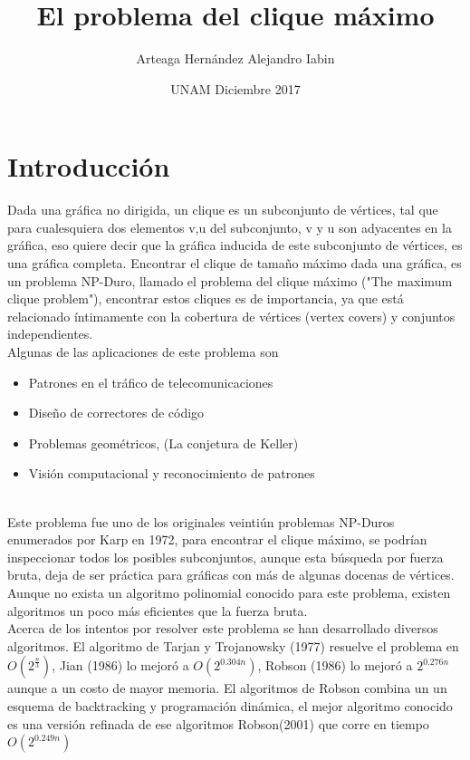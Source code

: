 \documentclass{article}
\title{El problema del clique máximo}
\author{Arteaga Hernández Alejandro Iabin}
\date{UNAM Diciembre 2017}
\begin{document}
\maketitle

\section{Introducción}
Dada una gráfica no dirigida, un clique es un subconjunto de vértices, tal que para cualesquiera dos elementos v,u del subconjunto, v y u son adyacentes en la gráfica, eso quiere decir que la gráfica inducida de este subconjunto de vértices, es una gráfica completa. Encontrar el clique de tamaño máximo dada una gráfica, es un problema NP-Duro, llamado el problema del clique máximo ("The maximum clique problem"), encontrar estos cliques es de importancia, ya que está relacionado íntimamente con la cobertura de vértices (vertex covers) y conjuntos independientes.\\

Algunas de las aplicaciones de este problema son
\begin{itemize}
   \item Patrones en el tráfico de telecomunicaciones
   \item Diseño de correctores de código
   \item Problemas geométricos, (La conjetura de Keller)
   \item Visión computacional y reconocimiento de patrones
   \\
\end{itemize}  

\\Este problema fue uno de los originales veintiún problemas NP-Duros enumerados por Karp en 1972, para encontrar el clique máximo, se podrían inspeccionar todos los posibles subconjuntos, aunque esta búsqueda por fuerza bruta, deja de ser práctica para gráficas con más de algunas docenas de vértices. Aunque no exista un algoritmo polinomial conocido para este problema, existen algoritmos un poco más eficientes que la fuerza bruta.\\

    Acerca de los intentos por resolver este problema se han desarrollado diversos
algoritmos. El algoritmo de Tarjan y Trojanowsky (1977) resuelve el problema en 
$O(2^{\frac{n}{3}})$, Jian (1986) lo mejoró a $O(2^{0.304n})$, Robson (1986) lo mejoró a $2^{0.276n}$ aunque a un costo de mayor memoria. El algoritmos de Robson combina un un esquema de backtracking y programación dinámica, el mejor algoritmo conocido es una versión refinada de ese algoritmos Robson(2001) que corre en tiempo $O(2^{0.249n})$\\
\end{document}
